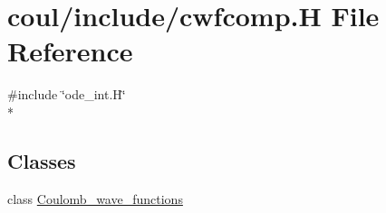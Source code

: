 \hypertarget{cwfcomp_8H}{\section{coul/include/cwfcomp.H File Reference}
\label{cwfcomp_8H}
}
{\ttfamily \#include \char`\"{}ode\-\_\-int.\-H\char`\"{}}\\*
\subsection*{Classes}
\begin{DoxyCompactItemize}
\item 
class \hyperlink{classCoulomb__wave__functions}{Coulomb\-\_\-wave\-\_\-functions}
\end{DoxyCompactItemize}
